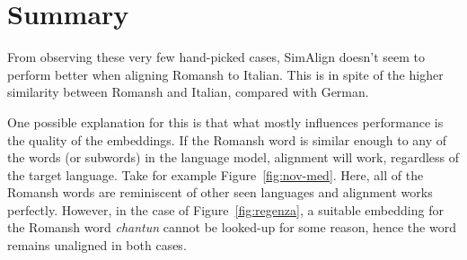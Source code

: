 \section{Summary}
From observing these very few hand-picked cases, SimAlign doesn't seem to perform better when aligning Romansh to Italian. 
This is in spite of the higher similarity between Romansh and Italian, compared with German. 

One possible explanation for this is that what mostly influences performance is the quality of the embeddings. 
If the Romansh word is similar enough to any of the words (or subwords) in the language model, alignment will work, regardless of the target language. Take for example Figure~\ref{fig:nov-med}. 
Here, all of the Romansh words are reminiscent of other seen languages and alignment works perfectly. 
However, in the case of Figure~\ref{fig:regenza}, a suitable embedding for the Romansh word \emph{chantun} cannot be looked-up for some reason, hence the word remains unaligned in both cases.


